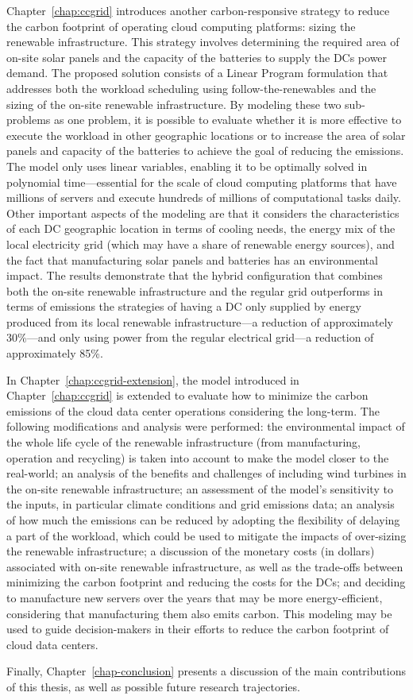 Chapter~\ref{chap:ccgrid} introduces another carbon-responsive strategy to reduce the carbon footprint of operating cloud computing platforms: sizing the renewable infrastructure. This strategy involves determining the required area of on-site solar panels and the capacity of the batteries to supply the DCs power demand. The proposed solution consists of a Linear Program formulation that addresses both the workload scheduling using follow-the-renewables and the sizing of the on-site renewable infrastructure. By modeling these two sub-problems as one problem, it is possible to evaluate whether it is more effective to execute the workload in other geographic locations or to increase the area of solar panels and capacity of the batteries to achieve the goal of reducing the  emissions. The model only uses linear variables, enabling it to be optimally solved in polynomial time---essential for the scale of cloud computing platforms that have millions of servers and execute hundreds of millions of computational tasks daily. Other important aspects of the modeling are that it considers the characteristics of each DC geographic location in terms of cooling needs, the energy mix of the local electricity grid (which may have a share of renewable energy sources), and the fact that manufacturing solar panels and batteries has an environmental impact. The results demonstrate that the hybrid configuration that combines both the on-site renewable infrastructure and the regular grid outperforms in terms of  emissions the strategies of having a DC only supplied by energy produced from its local renewable infrastructure---a reduction of approximately 30\%---and only using power from the regular electrical grid---a reduction of approximately 85\%.


In Chapter~\ref{chap:ccgrid-extension}, the model introduced in Chapter~\ref{chap:ccgrid} is extended to evaluate how to minimize the carbon emissions of the cloud data center operations considering the long-term. The following modifications and analysis were performed: the environmental impact of the whole life cycle of the renewable infrastructure (from manufacturing, operation and recycling) is taken into account to make the model closer to the real-world; an analysis of the benefits and challenges of including wind turbines in the on-site renewable infrastructure; an assessment of the model's sensitivity to the inputs, in particular climate conditions and grid emissions data; an analysis of how much the  emissions can be reduced by adopting the flexibility of delaying a part of the workload, which could be used to mitigate the impacts of over-sizing the renewable infrastructure; a discussion of the monetary costs (in dollars) associated with on-site renewable infrastructure, as well as the trade-offs between minimizing the carbon footprint and reducing the costs for the DCs; and deciding to manufacture new servers over the years that may be more energy-efficient, considering that manufacturing them also emits carbon. This modeling may be used to guide decision-makers in their efforts to reduce the carbon footprint of cloud data centers.


Finally, Chapter~\ref{chap-conclusion} presents a discussion of the main contributions of this thesis, as well as possible future research trajectories.